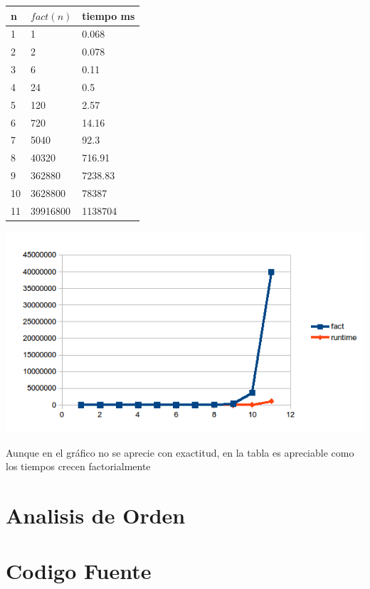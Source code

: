 \documentclass[12pt]{article}
\begin{document}
			\begin{center}
		 \begin{tabular}{|l|l|l|} \hline
		 	n &$fact(n)$ & tiempo ms \\ \hline
			1 & 1 & 0.068 \\ \hline
			2 & 2 & 0.078 \\ \hline
			3 & 6 & 0.11\\ \hline
			4 & 24 &  0.5\\ \hline
			5 & 120 &  2.57\\ \hline
			6 & 720 &  14.16\\ \hline
			7 & 5040 &  92.3\\ \hline
			8 & 40320 & 716.91\\ \hline
			9 & 362880 &  7238.83\\ \hline
			10 & 3628800&  78387\\ \hline
			11 & 39916800 & 1138704 \\ \hline
		\end{tabular}
		
		\includegraphics{graf.png}
	\end{center} 
		Aunque en el gráfico no se aprecie con exactitud, en la tabla es
		apreciable como los tiempos crecen factorialmente
\newpage
\section{Analisis de Orden}\label{sec:orden}		
		
\newpage
\section{Codigo Fuente}\label{sec:cf}
\end{document}
